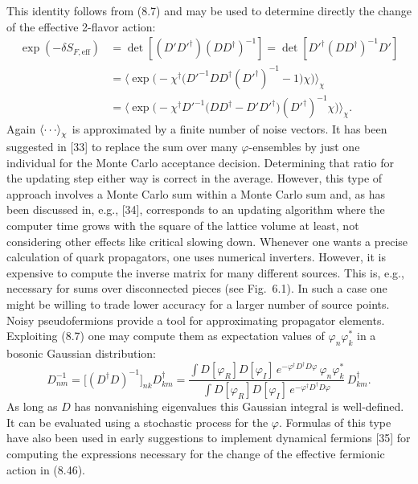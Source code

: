 This identity follows from (8.7) and may be used to determine directly the
change of the effective 2-flavor action:
\begin{equation}
\begin{split}
\exp(-\delta S_{F,\mathrm{eff}}) &= \det[(D'D'^\dagger)(DD^\dagger)^{-1}]
  = \det[D'^\dagger(DD^\dagger)^{-1}D']\\
&= \Big\langle\exp\big(-\chi^\dagger\big(D'^{-1}DD^\dagger(D'^\dagger)^{-1}-1\big)\chi\big)\Big\rangle_\chi\\
&= \Big\langle\exp\big(-\chi^\dagger D'^{-1}\big(DD^\dagger - D'D'^\dagger\big)(D'^\dagger)^{-1}\chi\big)\Big\rangle_\chi .
\end{split}
\end{equation}
Again $\ev{\cdots}_\chi$ is approximated by a finite number of noise vectors.
It has been suggested in [33] to replace the sum over many $\varphi$-ensembles
by just one individual for the Monte Carlo acceptance decision. Determining
that ratio for the updating step either way is correct in the average. However,
this type of approach involves a Monte Carlo sum within a Monte Carlo sum and,
as has been discussed in, e.g., [34], corresponds to an updating algorithm where
the computer time grows with the square of the lattice volume at least, not
considering other effects like critical slowing down.
Whenever one wants a precise calculation of quark propagators, one uses
numerical inverters. However, it is expensive to compute the inverse matrix for
many different sources. This is, e.g., necessary for sums over disconnected
pieces (see Fig.~6.1). In such a case one might be willing to trade lower
accuracy for a larger number of source points. Noisy pseudofermions provide a
tool for approximating propagator elements. Exploiting (8.7) one may compute
them as expectation values of $\varphi_n\varphi_k^*$ in a bosonic Gaussian
distribution:
\begin{equation}
D_{nm}^{-1} = \Big[(D^\dagger D)^{-1}\Big]_{nk}D_{km}^\dagger
= \frac{\int D[\varphi_R]D[\varphi_I]\,e^{-\varphi^\dagger D^\dagger D\varphi}\,\varphi_n\varphi_k^*}
       {\int D[\varphi_R]D[\varphi_I]\,e^{-\varphi^\dagger D^\dagger D\varphi}}\,D_{km}^\dagger .
\end{equation}
As long as $D$ has nonvanishing eigenvalues this Gaussian integral is
well-defined. It can be evaluated using a stochastic process for the
$\varphi$.
Formulas of this type have also been used in early suggestions to implement
dynamical fermions [35] for computing the expressions necessary for the change
of the effective fermionic action in (8.46).

